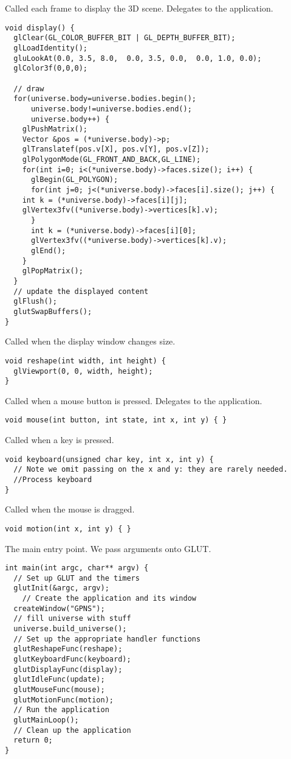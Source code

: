 Called each frame to display the 3D scene. Delegates to
the application.
\begin{lstlisting}
void display() {
  glClear(GL_COLOR_BUFFER_BIT | GL_DEPTH_BUFFER_BIT);
  glLoadIdentity();
  gluLookAt(0.0, 3.5, 8.0,  0.0, 3.5, 0.0,  0.0, 1.0, 0.0);
  glColor3f(0,0,0);
  
  // draw
  for(universe.body=universe.bodies.begin();
      universe.body!=universe.bodies.end();
      universe.body++) {
    glPushMatrix();
    Vector &pos = (*universe.body)->p;
    glTranslatef(pos.v[X], pos.v[Y], pos.v[Z]);
    glPolygonMode(GL_FRONT_AND_BACK,GL_LINE);
    for(int i=0; i<(*universe.body)->faces.size(); i++) {      
      glBegin(GL_POLYGON);
      for(int j=0; j<(*universe.body)->faces[i].size(); j++) {
	int k = (*universe.body)->faces[i][j]; 
	glVertex3fv((*universe.body)->vertices[k].v);
      }
      int k = (*universe.body)->faces[i][0]; 
      glVertex3fv((*universe.body)->vertices[k].v);
      glEnd();
    }
    glPopMatrix();
  }
  // update the displayed content
  glFlush();
  glutSwapBuffers();
}
\end{lstlisting}

Called when the display window changes size.
\begin{lstlisting}
void reshape(int width, int height) {
  glViewport(0, 0, width, height);
}
\end{lstlisting}

Called when a mouse button is pressed. Delegates to the
application.
\begin{lstlisting}
void mouse(int button, int state, int x, int y) { }
\end{lstlisting}

Called when a key is pressed.
\begin{lstlisting}
void keyboard(unsigned char key, int x, int y) {
  // Note we omit passing on the x and y: they are rarely needed.
  //Process keyboard
}
\end{lstlisting}

Called when the mouse is dragged.
\begin{lstlisting}
void motion(int x, int y) { }
\end{lstlisting}

The main entry point. We pass arguments onto GLUT.
\begin{lstlisting}
int main(int argc, char** argv) {
  // Set up GLUT and the timers
  glutInit(&argc, argv);
    // Create the application and its window
  createWindow("GPNS");
  // fill universe with stuff
  universe.build_universe();
  // Set up the appropriate handler functions
  glutReshapeFunc(reshape);
  glutKeyboardFunc(keyboard);
  glutDisplayFunc(display);
  glutIdleFunc(update);
  glutMouseFunc(mouse);
  glutMotionFunc(motion);  
  // Run the application
  glutMainLoop();  
  // Clean up the application
  return 0;
}
\end{lstlisting}
